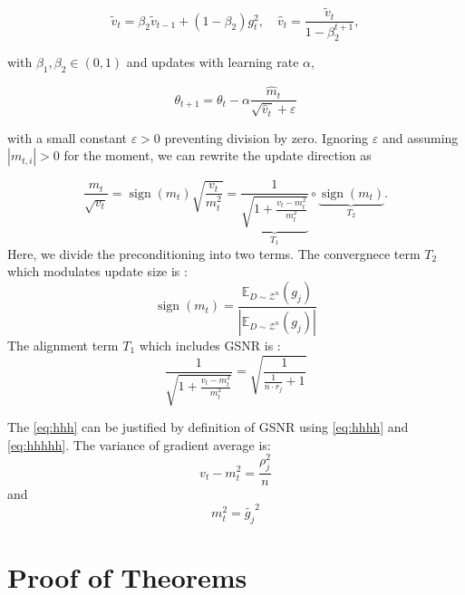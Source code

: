 \documentclass{article}
\theoremstyle{plain}
\theoremstyle{definition}
\theoremstyle{remark}
\begin{document}
\begin{equation}
    \tilde{v}_t = \beta_2 \tilde{v}_{t-1} + (1 - \beta_2) g_t^2, \quad
    \hat{v}_t = \frac{\tilde{v}_t}{1 - \beta_2^{t+1}},
\end{equation}

with \(\beta_1, \beta_2 \in (0,1)\) and updates with learning rate $\alpha$,

\begin{equation}
    \theta_{t+1} = \theta_t - \alpha \frac{\hat{m}_t}{\sqrt{\hat{v}_t} + \varepsilon}
\end{equation}

with a small constant \(\varepsilon > 0\) preventing division by zero. Ignoring \(\varepsilon\) and assuming \(|m_{t,i}| > 0\) for the moment, we can rewrite the update direction as

\begin{equation}
    \frac{m_t}{\sqrt{v_t}} = \operatorname{sign}(m_t) \sqrt{\frac{v_t}{m_t^2}}
    = \underbrace{\frac{1}{\sqrt{1 + \frac{v_t - m_t^2}{m_t^2}}}}_{T_1} \circ \underbrace{\operatorname{sign}(m_t)}_{T_2}.
\end{equation}
Here, we divide the preconditioning into two terms. The convergnece term $T_2$ which modulates update size is :
\begin{equation}
\operatorname{sign}(m_t)=
    \frac{\mathbb{E}_{D \sim \mathcal{Z}^n} \left( g_j \right)}{\left| \mathbb{E}_{D \sim \mathcal{Z}^n} \left( g_j \right) \right|}
\end{equation}
The alignment term $T_1$ which includes GSNR is :
\begin{equation}
\frac{1}{\sqrt{1 + \frac{v_t - m_t^2}{m_t^2}}}=
    \sqrt{\frac{1}{\frac{1}{n \cdot r_j} + 1}}
    \label{eq:hhh}
\end{equation}

The \cref{eq:hhh} can be justified by definition of GSNR using \cref{eq:hhhh} and \cref{eq:hhhhh}. The variance of gradient average is:
\begin{equation}
    v_t - m_t^2=\frac{\rho_j^2}{n}
\label{eq:hhhh}
\end{equation}
and 
\begin{equation}
    m_t^2=\widetilde{g_j}^2
    \label{eq:hhhhh}
\end{equation}

\section{Proof of Theorems}
\label{ap: Proof of Theorems}
\end{document}
